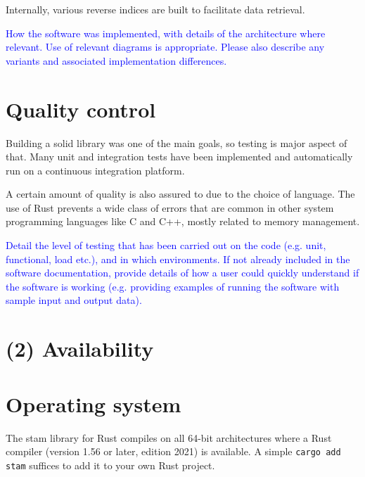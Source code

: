 \documentclass{jors}
\begin{document}
Internally, various reverse indices are built to facilitate data retrieval.






\textcolor{blue}{How the software was implemented, with details of the
architecture where relevant. Use of relevant diagrams is appropriate. Please
also describe any variants and associated implementation differences.}

\section*{Quality control}

Building a solid library was one of the main goals, so testing is major 
aspect of that. Many unit and integration tests have been implemented and
automatically run on a continuous integration platform.

A certain amount of quality is also assured to due to the choice of
language. The use of Rust prevents a wide class of errors that are common in
other system programming languages like C and C++, mostly related to memory
management.






\textcolor{blue}{Detail the level of testing that has been carried out on the
code (e.g. unit, functional, load etc.), and in which environments. If not
already included in the software documentation, provide details of how a user
could quickly understand if the software is working (e.g. providing examples of
running the software with sample input and output data). }

\section*{(2) Availability}
\vspace{0.5cm}
\section*{Operating system}

The stam library for Rust compiles on all 64-bit architectures where a Rust compiler (version 1.56 or later, edition 2021) is available.
A simple \texttt{cargo add stam} suffices to add it to your own Rust project.
\end{document}
